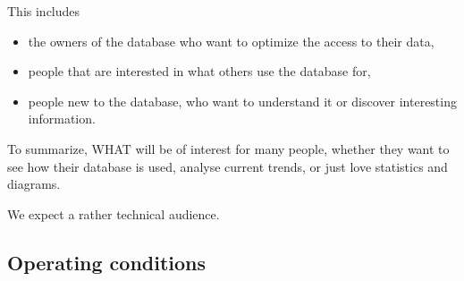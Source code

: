 This includes
\begin{itemize}
  \item the owners of the \gls{database} who want to optimize the access to
  	their data,
  	
  \item people that are interested in what others use the \gls{database} for,

  
  \item people new to the \gls{database}, who want to understand it or discover interesting information.

\end{itemize}
To summarize, WHAT will be of interest for many people, 
whether they want to see how their \gls{database} is used, analyse current trends,
or just love statistics and \glspl{diagram}.

%   
%   




We expect a rather technical audience.
 
 

\subsection{Operating conditions}

